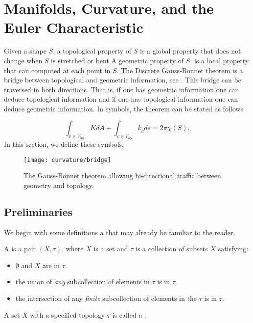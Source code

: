 
\section{Manifolds, Curvature, and the Euler Characteristic}
\label{sec:cast}



Given a shape $S$, a topological property of $S$ is a global property that does
not change when $S$ is stretched or bent
A geometric property of $S$, is a local property that can computed at each point in $S$.
The Discrete Gauss-Bonnet theorem is a bridge between topological
and geometric information, see . This bridge can be traversed in both directions.
That is, if one has geometric information one can deduce topological information and
if one has topological information one can deduce geometric information.
In symbols, the theorem can be stated as follows

\begin{equation} \label{eqn:g-b}
\int_{v\in V_{int}} K dA + \int_{v\in V_{\partial S}} k_g ds = 2\pi \chi(S).
\end{equation}
In this section, we define these symbols.

\begin{figure}[htb]
\centering
\texttt{[image: curvature/bridge]}
\caption{The Gauss-Bonnet theorem allowing bi-directional traffic
between geometry and topology.}
\label{fig:bridge}
\end{figure}

\subsection{Preliminaries}

We begin with some definitions a that may already be familiar to the reader,
\begin{definition}
A  is a pair $(X,\tau)$, where $X$ is a set and
 $\tau$ is a collection of subsets $X$
satisfying:
	\begin{itemize}
		\item $\emptyset$ and $X$ are in $\tau.$
		\item the union of \emph{any} subcollection of elements in $\tau$ is  in $\tau.$
		\item the intersection of any \emph{finite} subcollection of elements in the $\tau$ is in $\tau.$
	\end{itemize}
A set $X$ with a specified topology $\tau$ is called a .
\end{definition}

